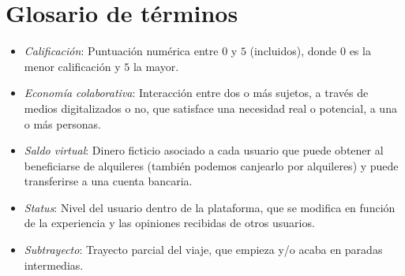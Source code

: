 \documentclass[11pt,spanish]{article} %
\begin{document}
\section{Glosario de términos}
\begin{itemize}
	\item \textit{Calificación}: Puntuación numérica entre $0$ y $5$ (incluidos), donde $0$ es la menor calificación y $5$ la mayor.
	\item \textit{Economía colaborativa}: Interacción entre dos o más sujetos, a través de medios digitalizados o no, que satisface una necesidad real o potencial, a una o más personas.	
	\item \textit{Saldo virtual}: Dinero ficticio asociado a cada usuario que puede obtener al beneficiarse de alquileres (también podemos canjearlo por alquileres) y puede transferirse a una cuenta bancaria.
	\item \textit{Status}: Nivel del usuario dentro de la plataforma, que se modifica en función de la experiencia y las opiniones recibidas de otros usuarios.	
	\item \textit{Subtrayecto}: Trayecto parcial del viaje, que empieza y/o acaba en paradas intermedias.
\end{itemize}










\end{document}
